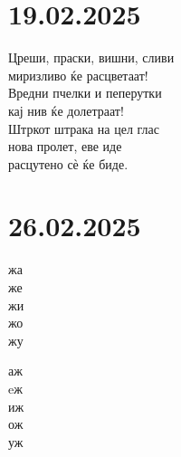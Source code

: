 \documentclass[a5paper,12pt]{article}
\newenvironment{song}{%
  \begin{tcolorbox}[colback=warmredbg,colframe=warmred,title={\textbf{Песничка}},fonttitle=\bfseries]
}{%
  \end{tcolorbox}
}
\begin{document}
\section{19.02.2025}
\begin{song}
  Цреши, праски, вишни, сливи\\
  миризливо ќе расцветаат!\\
  Вредни пчелки и пеперутки\\
  кај нив ќе долетраат!\\

  Штркот штрака на цел глас\\
  нова пролет, еве иде\\
  расцутено сѐ ќе биде.
\end{song}

\section{26.02.2025}
\noindent
\begin{minipage}[t]{0.45\textwidth}
  жа\\ же\\ жи\\ жо\\ жу
\end{minipage}
\hfill
\begin{minipage}[t]{0.45\textwidth}
аж\\ eж\\ иж\\ ож\\ уж
\end{minipage}

\vspace{1cm}
\end{document}
